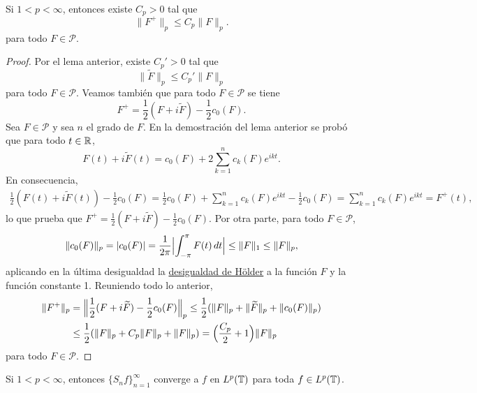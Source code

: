 \documentclass[a4paper, 12pt, oneside]{book}
\begin{document}
\begin{lemma}
    Si $1 < p < \infty$, entonces existe $C_p > 0$ tal que
    \[\|F^+\|_p \leq C_p \|F\|_{p}.\]
    para todo $F \in \mathcal{P}$.
\end{lemma}

\begin{proof}
    Por el lema anterior, existe $C_p'>0$ tal que
    \[\|\widetilde{F}\|_p\leq C_p' \|F\|_p\]
    para todo $F \in \mathcal{P}$. Veamos también que para todo $F \in \mathcal{P}$ se tiene
    \[F^+ = \frac{1}{2}(F+i\widetilde{F})-\frac{1}{2}c_0(F).\] 
    Sea $F\in\mathcal{P}$ y sea $n$ el grado de $F$. En la demostración del lema anterior se probó que para todo $t\in\mathbb R$,
    \[F(t)+i\widetilde{F}(t) = c_0(F)+2\sum_{k=1}^n c_k(F)e^{ikt}.\]
    En consecuencia,
    \begin{align*}
        \frac{1}{2}(F(t)+i\widetilde{F}(t))-\frac{1}{2}c_0(F) = \frac{1}{2}c_0(F)+\sum_{k=1}^n c_k(F)e^{ikt}-\frac{1}{2}c_0(F) = \sum_{k=1}^n c_k(F)e^{ikt} = F^+(t),
    \end{align*}
    lo que prueba que $F^+=\frac{1}{2}(F+i\widetilde{F})-\frac{1}{2}c_0(F)$. Por otra parte, para todo $F\in\mathcal{P}$,
    \[\|c_0(F)\|_p = |c_0(F)| = \frac{1}{2\pi}\Bigl|\int_{-\pi}^{\pi} F(t) \, dt\Bigr| \leq \|F\|_1\leq \|F\|_p,\]
    aplicando en la última desigualdad la \hyperref[1.1.1]{\color{blue}desigualdad de Hölder} a la función $F$ y la función constante 1. Reuniendo todo lo anterior,
    \begin{align*}
        \|F^+\|_p &= \Bigl\|\frac{1}{2}(F+i\widetilde{F})-\frac{1}{2}c_0(F)\Bigr\|_p \leq \frac{1}{2}(\|F\|_p+\|\widetilde{F}\|_p+\|c_0(F)\|_p) \\ 
        &\leq \frac{1}{2}(\|F\|_p+C_p\|F\|_p+\|F\|_p) = \Bigl(\frac{C_p}{2}+1\Bigr)\|F\|_p
    \end{align*}
    para todo $F\in\mathcal{P}$.
\end{proof}

\begin{theorem}
    Si $1 < p < \infty$, entonces $\{S_nf\}_{n=1}^\infty$ converge a $f$ en $L^p(\mathbb T)$ para toda $f \in L^p(\mathbb T)$.
\end{theorem}
\end{document}
